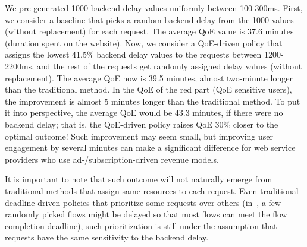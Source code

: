 We pre-generated 1000 backend delay values uniformly between 100-300ms. 
First, we consider a baseline that picks a random backend delay from the 1000 values (without replacement) for each request. The average QoE value is 37.6 minutes (duration spent on the website).
Now, we consider a QoE-driven policy that assigns the lowest 41.5\% backend delay values to the requests between 1200-2200ms, and the rest of the requests get randomly assigned delay values (without replacement). 
The average QoE now is 39.5 minutes, almost two-minute longer than the traditional method. In the QoE of the red part (QoE sensitive users), the improvement is almost 5 minutes longer than the traditional method. To put it into perspective, the average QoE would be 43.3 minutes, if there were no backend delay; that is, the QoE-driven policy raises QoE 30\% closer to the optimal outcome!
Such improvement may seem small, but improving user engagement by several minutes can make a significant difference for web service providers who use ad-/subscription-driven revenue models.

It is important to note that such outcome will not naturally emerge from traditional methods that assign same resources to each request.
Even traditional deadline-driven policies that prioritize some requests over others (\eg in~\cite{wilson2011better}, a few randomly picked flows might be delayed so that most flows can meet the flow completion deadline), such prioritization is still under the assumption that requests have the same sensitivity to the backend delay.


